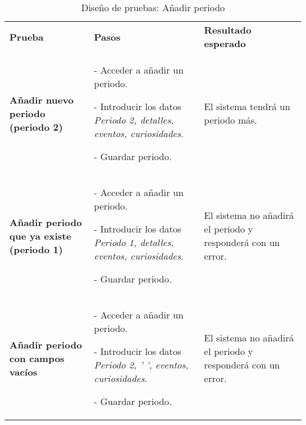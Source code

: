 \begin{table}[H]
\vspace{-4mm}
  \centering
  \caption{Diseño de pruebas: Añadir periodo}
    \begin{tabular}{p{8em}p{14em}p{14em}}
    \toprule
    \rowcolor[rgb]{ .851,  .886,  .953} \multicolumn{3}{p{36em}}{\textbf{Añadir periodo}} \\ \midrule
    \rowcolor[rgb]{ .949,  .949,  .949} \textbf{Prueba} & \textbf{Pasos} & \textbf{Resultado esperado}\\ \midrule
    \textbf{Añadir nuevo periodo (periodo 2)} & - Acceder a añadir un periodo.\par - Introducir los datos \textit{Periodo 2, detalles, eventos, curiosidades}. \par - Guardar periodo. & El sistema tendrá un periodo más. \\ \midrule
    \textbf{Añadir periodo que ya existe (periodo 1)} & - Acceder a añadir un periodo.\par - Introducir los datos \textit{Periodo 1, detalles, eventos, curiosidades}. \par - Guardar periodo. & El sistema no añadirá el periodo y responderá con un error.  \\ \midrule
    \textbf{Añadir periodo con campos vacíos} &  - Acceder a añadir un periodo.\par - Introducir los datos \textit{Periodo 2, ' ', eventos, curiosidades}. \par - Guardar periodo. & El sistema no añadirá el periodo y responderá con un error. \\ \bottomrule
    \end{tabular}%
\end{table}%
